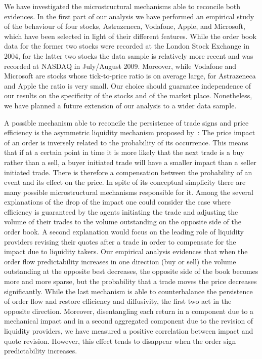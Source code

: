 \documentclass[12pt]{iopart}
\begin{document}
We have investigated the microstructural mechanisms able to reconcile both evidences. In the first part of our analysis we have performed an empirical study of the behaviour of four stocks, Astrazeneca, Vodafone, Apple, and Microsoft, which have been selected in light of their different features. While the order book data for the former two stocks were recorded at the London Stock Exchange in 2004, for the latter two stocks the data sample is relatively more recent and was recorded at NASDAQ in July/August 2009. Moreover, while Vodafone and Microsoft are stocks whose tick-to-price ratio is on average large, for Astrazeneca and Apple the ratio is very small. Our choice should guarantee independence of our results on the specificity of the stocks and of the market place. Nonetheless, we have planned a future extension of our analysis to a wider data sample.

A possible mechanism able to reconcile the persistence of trade signs and price efficiency is the asymmetric liquidity mechanism proposed by~\cite{lillo2004long}: The price impact of an order is inversely related to the probability of its occurrence. This means that if at a certain point in time it is more likely that the next trade is a buy rather than a sell, a buyer initiated trade will have a smaller impact than a seller initiated trade. There is therefore a compensation between the probability of an event and its effect on the price. In spite of its conceptual simplicity there are many possible microstructural mechanisms responsible for it. Among the several explanations of the drop of the impact one could consider the case where efficiency is guaranteed by the agents initiating the trade and adjusting the volume of their trades to the volume outstanding on the opposite side of the order book. A second explanation would focus on the leading role of liquidity providers revising their quotes after a trade in order to compensate for the impact due to liquidity takers. Our empirical analysis evidences that when the order flow predictability increases in one direction (buy or sell) the volume outstanding at the opposite best decreases, the opposite side of the book becomes more and more sparse, but the probability that a trade moves the price decreases significantly. While the last mechanism is able to counterbalance the persistence of order flow and restore efficiency and diffusivity, the first two act in the opposite direction. Moreover, disentangling each return in a component due to a mechanical impact and in a second aggregated component due to the revision of liquidity providers, we have measured a positive correlation between impact and quote revision. However, this effect tends to disappear when the order sign predictability increases.  
\end{document}
